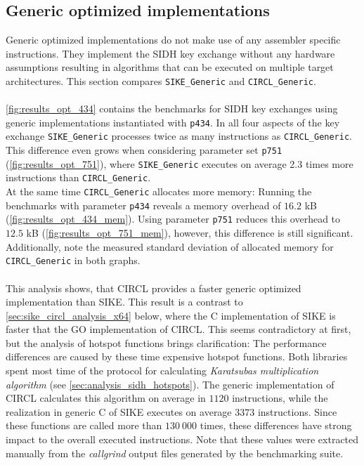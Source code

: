 \subsection{Generic optimized implementations}\label{sec:sike_circl_analysis_generic}
Generic optimized implementations do not make use of any assembler specific instructions. They implement the \gls{SIDH} key exchange without any hardware assumptions resulting in  algorithms that can be executed on multiple target architectures. This section compares \texttt{SIKE\_Generic} and \texttt{CIRCL\_Generic}.
\\\\
\autoref{fig:results_opt_434} contains the benchmarks for \gls{SIDH} key exchanges using generic implementations instantiated with \texttt{p434}.  In all four aspects of the key exchange \texttt{SIKE\_Generic} processes twice as many instructions as \texttt{CIRCL\_Generic}. This difference even grows when considering parameter set \texttt{p751} (\autoref{fig:results_opt_751}), where \texttt{SIKE\_Generic} executes on average 2.3 times more instructions than \texttt{CIRCL\_Generic}.\\
At the same time \texttt{CIRCL\_Generic} allocates more memory: Running the benchmarks with parameter \texttt{p434} reveals a memory overhead of $16.2$ \gls{kB} (\autoref{fig:results_opt_434_mem}). Using parameter \texttt{p751} reduces this overhead to $12.5$ \gls{kB} (\autoref{fig:results_opt_751_mem}), however, this difference is still significant. Additionally, note the measured standard deviation of allocated memory for \texttt{CIRCL\_Generic} in both graphs.
\\\\
This analysis shows, that \gls{CIRCL} provides a faster generic optimized implementation than \gls{SIKE}. This result is a contrast to \autoref{sec:sike_circl_analysis_x64} below, where the C implementation of \gls{SIKE} is faster that the GO implementation of \gls{CIRCL}. This seems contradictory at first, but the analysis of hotspot functions brings clarification: The performance differences are caused by these time expensive hotspot functions. Both libraries spent most time of the protocol for calculating \textit{Karatsubas multiplication algorithm} (see \autoref{sec:analysis_sidh_hotspots}). The generic implementation of \gls{CIRCL} calculates this algorithm on average in $1120$ instructions, while the realization in generic C of \gls{SIKE} executes on average $3373$ instructions. Since these functions are called more than $130\:000$ times, these differences have strong impact to the overall executed instructions. Note that these values were extracted manually from the \textit{callgrind} output files generated by the benchmarking suite.

